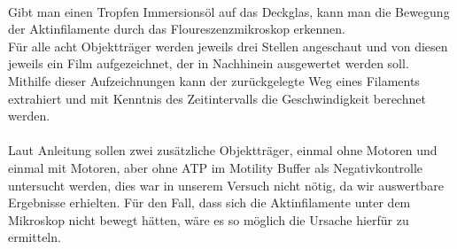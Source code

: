 \\
Gibt man einen Tropfen Immersionsöl auf das Deckglas, kann man die Bewegung der Aktinfilamente durch das Floureszenzmikroskop erkennen.\\
Für alle acht Objektträger werden jeweils drei Stellen angeschaut und von diesen jeweils ein Film aufgezeichnet, der in Nachhinein ausgewertet werden soll. Mithilfe dieser Aufzeichnungen kann der zurückgelegte Weg eines Filaments extrahiert und mit Kenntnis des Zeitintervalls die Geschwindigkeit berechnet werden.\\
\\
Laut Anleitung sollen zwei zusätzliche Objektträger, einmal ohne Motoren und einmal mit Motoren, aber ohne ATP im Motility Buffer als Negativkontrolle untersucht werden, dies war in unserem Versuch nicht nötig, da wir auswertbare Ergebnisse erhielten. Für den Fall, dass sich die Aktinfilamente unter dem Mikroskop nicht bewegt hätten, wäre es so möglich die Ursache hierfür zu ermitteln.
